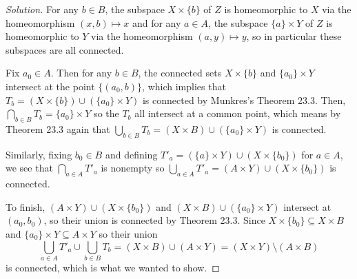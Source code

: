 \documentclass[10pt]{article}
\newenvironment{soln}{\begin{proof}[Solution]}{\end{proof}}
\begin{document}
\begin{soln}
    For any $b\in B$, the subspace $X\times\{b\}$ of $Z$
    is homeomorphic to $X$ via the homeomorphism $(x,b)\mapsto x$
    and for any $a\in A$, the subspace $\{a\}\times Y$ of $Z$
    is homeomorphic to $Y$ via the homeomorphism $(a,y)\mapsto y$,
    so in particular these subspaces are all connected.

    Fix $a_0\in A$. Then for any $b\in B$, the connected sets
    $X\times\{b\}$ and $\{a_0\}\times Y$ intersect at the point
    $\{(a_0,b)\}$, which implies that $T_b = (X\times\{b\})\cup(\{a_0\}\times Y)$
    is connected by Munkres's Theorem 23.3.
    Then, $\bigcap_{b\in B} T_b = \{a_0\}\times Y$ so the $T_b$
    all intersect at a common point, which means by Theorem 23.3 again
    that $\bigcup_{b\in B} T_b = (X\times B)\cup(\{a_0\}\times Y)$
    is connected.

    Similarly, fixing $b_0\in B$ and defining
    $T'_a = (\{a\}\times Y)\cup(X\times\{b_0\})$ for $a\in A$,
    we see that $\bigcap_{a\in A}T'_a$ is nonempty
    so $\bigcup_{a\in A}T'_a = (A\times Y)\cup(X\times\{b_0\})$ is connected.

    To finish, $(A\times Y)\cup(X\times\{b_0\})$ and
    $(X\times B)\cup(\{a_0\}\times Y)$ intersect at $(a_0,b_0)$,
    so their union is connected by Theorem 23.3.
    Since $X\times\{b_0\}\subseteq X\times B$ and $\{a_0\}\times Y\subseteq A\times Y$
    so their union
    \begin{equation*}
	\bigcup_{a\in A}T'_a\cup\bigcup_{b\in B}T_b =
	(X\times B)\cup(A\times Y) = (X\times Y)\setminus (A\times B)
    \end{equation*}
    is connected, which is what we wanted to show.
\end{soln}
\end{document}
